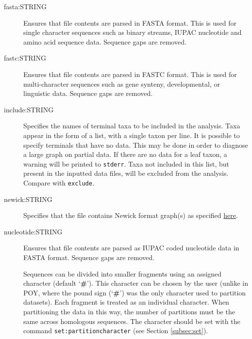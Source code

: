 \begin{description}
		\item [fasta:STRING] Ensures that file contents are parsed in FASTA \citep{PearsonandLipman1988}
		format. This is used for single character sequences such as binary streams, IUPAC 
		nucleotide and amino acid sequence data. Sequence gaps are removed.
			
		\item [fastc:STRING] Ensures that file contents are parsed in FASTC \citep{WheelerandWashburn2019}
		format. This is used for multi-character sequences such as gene synteny, developmental, 
		or linguistic data. Sequence gaps are removed.
			
		

	
		\item [include:STRING] Specifies the names of terminal taxa to be included in the analysis. 
		Taxa appear in the form of a list, with a single taxon per line. It is possible to specify 
		terminals that have no data. This may be done in order to diagnose a large graph on 
		partial data. If there are no data for a leaf taxon, a warning will be printed to \texttt{stderr}. 
		Taxa not included in this list, but present in the inputted data files, will be excluded from 
		the analysis. Compare with \texttt{exclude}.
			
		\item [newick:STRING] Specifies that the file contains Newick format graph(s) as specified 
		\href{https://evolution.genetics.washington.edu/phylip/newick_doc.html}{here}.
			
		\item [nucleotide:STRING] Ensures that file contents are parsed as IUPAC coded nucleotide 
		data in FASTA \citep{PearsonandLipman1988} format. Sequence gaps are removed.
		
		\begin{tcolorbox}[enhanced,fit to height=3.5cm,
  		colback=JungleGreen!40!black!2!white,colframe=JungleGreen!70!black,title=Note,
  		drop fuzzy shadow]
  		Sequences can be divided into smaller fragments using an assigned character (default 
		`\textbf{\#}'). This character can be chosen by the user (unlike in POY, where the pound sign 
		(`\textbf{\#}') was the only character used to partition datasets). Each fragment is treated as 
		an individual character. When partitioning the data in this way, the number of partitions must 
		be the same across homologous sequences. The character should be set with the command 
		\texttt{set:partitioncharacter} (see Section \ref{subsec:set}).
		\end{tcolorbox}
			

\end{description}
